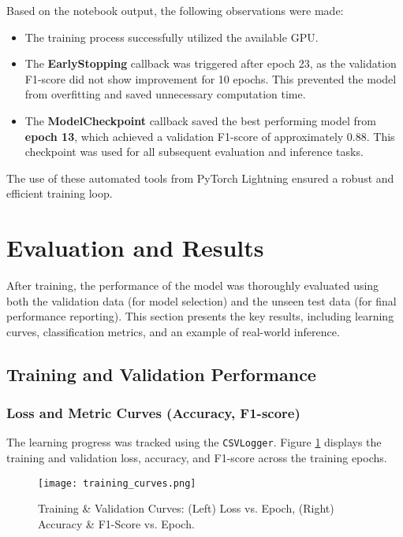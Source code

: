 \documentclass[11pt, a4paper]{article}
\begin{document}
Based on the notebook output, the following observations were made:
\begin{itemize}
    \item The training process successfully utilized the available GPU.
    \item The \textbf{EarlyStopping} callback was triggered after epoch 23, as the validation F1-score did not show improvement for 10 epochs. This prevented the model from overfitting and saved unnecessary computation time.
    \item The \textbf{ModelCheckpoint} callback saved the best performing model from \textbf{epoch 13}, which achieved a validation F1-score of approximately 0.88. This checkpoint was used for all subsequent evaluation and inference tasks.
\end{itemize}
The use of these automated tools from PyTorch Lightning ensured a robust and efficient training loop.



\section{Evaluation and Results}
After training, the performance of the model was thoroughly evaluated using both the validation data (for model selection) and the unseen test data (for final performance reporting). This section presents the key results, including learning curves, classification metrics, and an example of real-world inference.

\subsection{Training and Validation Performance}

\subsubsection{Loss and Metric Curves (Accuracy, F1-score)}
The learning progress was tracked using the \texttt{CSVLogger}. Figure \ref{fig:training_curves} displays the training and validation loss, accuracy, and F1-score across the training epochs.

\begin{figure}[H]
    \centering
    \texttt{[image: training\_curves.png]} %
    \caption{Training \& Validation Curves: (Left) Loss vs. Epoch, (Right) Accuracy \& F1-Score vs. Epoch.}
    \label{fig:training_curves}
\end{figure}
\end{document}
